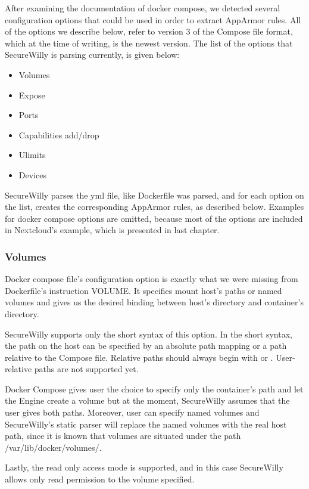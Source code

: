 After examining the documentation of docker compose, we detected several configuration options that could be used in order to extract AppArmor rules. All of the options we describe below, refer to version 3 of the Compose file format, which at the time of writing, is the newest version.
The list of the options that SecureWilly is parsing currently, is given below:

\begin{itemize}
\item Volumes
\item Expose
\item Ports
\item Capabilities add/drop
\item Ulimits
\item Devices
\end{itemize}

SecureWilly parses the yml file, like Dockerfile was parsed, and for each option on the list, creates the corresponding AppArmor rules, as described below. Examples for docker compose options are omitted, because most of the options are included in Nextcloud's example, which is presented in last chapter.

\subsubsection{Volumes}
Docker compose file's configuration option  is exactly what we were missing from Dockerfile's instruction VOLUME. It specifies mount host's paths or named volumes and gives us the desired binding between host's directory and container's directory.

SecureWilly supports only the short syntax of this option. In the short syntax, the path on the host can be specified by an absolute path mapping or a path relative to the Compose file. Relative paths should always begin with  or . User-relative paths are not supported yet.

Docker Compose gives user the choice to specify only the container's path and let the Engine create a volume but at the moment, SecureWilly assumes that the user gives both paths. Moreover, user can specify named volumes and SecureWilly's static parser will replace the named volumes with the real host path, since it is known that volumes are situated under the path /var/lib/docker/volumes/. 

Lastly, the read only access mode is supported, and in this case SecureWilly allows only read permission to the volume specified.

